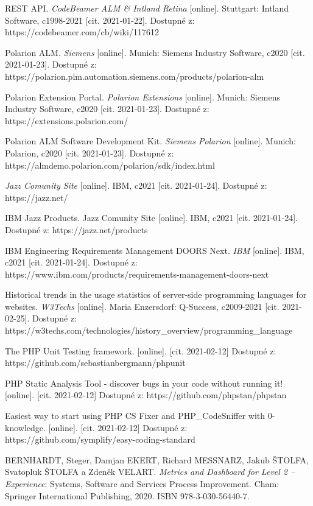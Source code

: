 \documentclass[czech,master]{diploma}
\begin{document}
\begin{thebibliography}{43}
REST API. \textit{CodeBeamer ALM \& Intland Retina} [online]. Stuttgart: Intland Software, c1998-2021 [cit. 2021-01-22]. Dostupné z: https://codebeamer.com/cb/wiki/117612

Polarion ALM. \textit{Siemens} [online]. Munich: Siemens Industry Software, c2020 [cit. 2021-01-23]. Dostupné z: https://polarion.plm.automation.siemens.com/products/polarion-alm

Polarion Extension Portal. \textit{Polarion Extensions} [online]. Munich: Siemens Industry Software, c2020 [cit. 2021-01-23]. Dostupné z: https://extensions.polarion.com/

Polarion ALM Software Development Kit. \textit{Siemens Polarion} [online]. Munich: Polarion, c2020 [cit. 2021-01-23]. Dostupné z: https://almdemo.polarion.com/polarion/sdk/index.html

\textit{Jazz Comunity Site} [online]. IBM, c2021 [cit. 2021-01-24]. Dostupné z: https://jazz.net/

IBM Jazz Products. Jazz Comunity Site [online]. IBM, c2021 [cit. 2021-01-24]. Dostupné z: https://jazz.net/products

IBM Engineering Requirements Management DOORS Next. \textit{IBM} [online]. IBM, c2021 [cit. 2021-01-24]. Dostupné z: https://www.ibm.com/products/requirements-management-doors-next

Historical trends in the usage statistics of server-side programming languages for websites. \textit{W3Techs} [online]. Maria Enzersdorf: Q-Success, c2009-2021 [cit. 2021-02-25]. Dostupné z: https://w3techs.com/technologies/history\_overview/programming\_language

 The PHP Unit Testing framework. [online]. [cit. 2021-02-12] Dostupné z: https://github.com/sebastianbergmann/phpunit

 PHP Static Analysis Tool - discover bugs in your code without running it! [online]. [cit. 2021-02-12] Dostupné z: https://github.com/phpstan/phpstan

 Easiest way to start using PHP CS Fixer and PHP\_CodeSniffer with 0-knowledge. [online]. [cit. 2021-02-12] Dostupné z: https://github.com/symplify/easy-coding-standard

BERNHARDT, Steger, Damjan EKERT, Richard MESSNARZ, Jakub ŠTOLFA, Svatopluk ŠTOLFA a Zdeněk VELART. \textit{Metrics and Dashboard for Level 2 – Experience}: Systems, Software and Services Process Improvement. Cham: Springer International Publishing, 2020. ISBN 978-3-030-56440-7.


\end{thebibliography}
\end{document}
